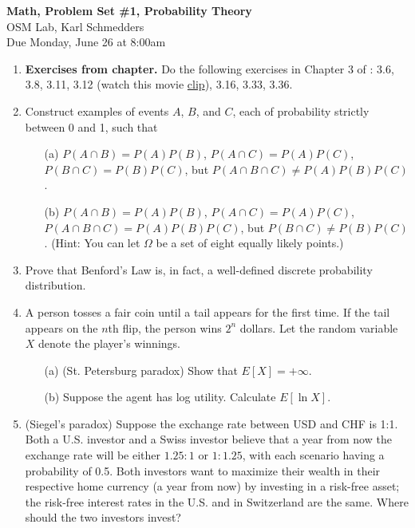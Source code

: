 \documentclass[letterpaper,12pt]{article}
\theoremstyle{definition}
\begin{document}
\begin{flushleft}
   \textbf{\large{Math, Problem Set \#1, Probability Theory}} \\[5pt]
   OSM Lab, Karl Schmedders \\[5pt]
   Due Monday, June 26 at 8:00am
\end{flushleft}

\vspace{5mm}

\begin{enumerate}
	\item {\bf Exercises from chapter.} Do the following exercises in Chapter 3 of \citet{HJ17}: 3.6, 3.8, 3.11, 3.12 (watch this movie \href{https://www.youtube.com/watch?v=Zr_xWfThjJ0}{clip}), 3.16, 3.33, 3.36.
	\item Construct examples of events $A$, $B$, and $C$, each of probability strictly between 0 and 1, such that
   		\begin{itemize}
			\item[(a)] $P(A  \cap B) = P(A)P(B)$, $P(A  \cap C) = P(A)P(C)$, $P(B  \cap C) = P(B)P(C)$, but $P(A  \cap B \cap C) \neq P(A)P(B)P(C)$.
			\item[(b)] $P(A  \cap B) = P(A)P(B)$, $P(A  \cap C) = P(A)P(C)$, $P(A  \cap B \cap C) = P(A)P(B)P(C)$, but $P(B  \cap C) \neq P(B)P(C)$. (Hint: You can let $\Omega$ be a set of eight equally likely points.)
		\end{itemize}
   	\item Prove that Benford's Law is, in fact, a well-defined discrete probability distribution.
   	\item A person tosses a fair coin until a tail appears for the first time. If the tail appears on the $n$th flip, the person wins $2^n$ dollars. Let the random variable $X$ denote the player's winnings.
		\begin{itemize}
			\item[(a)] (St. Petersburg paradox) Show that $E[X]= + \infty$.
			\item[(b)] Suppose the agent has log utility. Calculate $E[\ln X]$.
		\end{itemize}
	\item (Siegel's paradox) Suppose the exchange rate between USD and CHF is 1:1. Both a U.S. investor and a Swiss investor believe that a year from now the exchange rate will be either $1.25:1$ or $1:1.25$, with each scenario having a probability of 0.5. Both investors want to maximize their wealth in their respective home currency (a year from now) by investing in a risk-free asset; the risk-free interest rates in the U.S. and in Switzerland are the same. Where should the two investors invest?


\end{enumerate}
\end{document}
